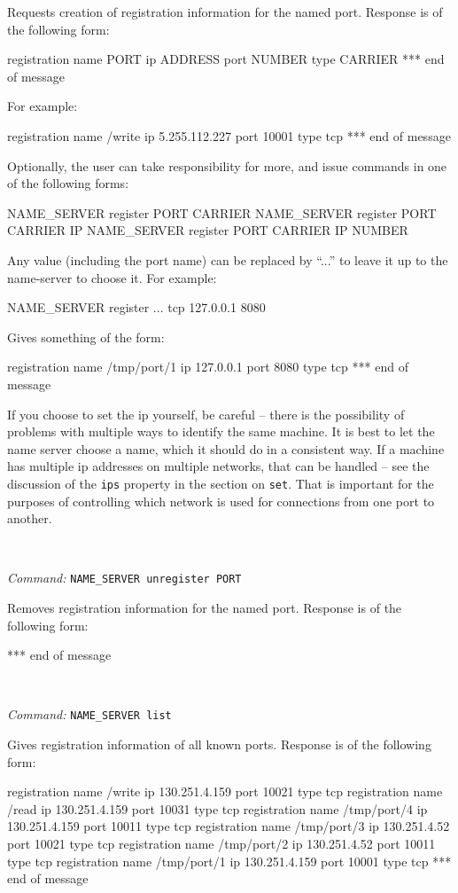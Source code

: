 \documentclass[a4]{article}
\newenvironment{packed_itemize}{
\begin{itemize}
  \renewcommand{\labelitemi}{$\triangleright$}
  \setlength{\itemsep}{1pt}
  \setlength{\parskip}{0pt}
  \setlength{\parsep}{0pt}
}{\end{itemize}}
\newcommand{\newusage}{\ \\\noindent\makebox[\textwidth]{\hrulefill}}
\newcommand{\usage}[1]{ \begin{packed_itemize} \item {\it Command:} {\tt #1} \end{packed_itemize}}
\begin{document}
Requests creation of registration information for the named port.  
Response is of the following form:
\begin{code}
registration name PORT ip ADDRESS port NUMBER type CARRIER
*** end of message
\end{code}
For example:
\begin{code}
registration name /write ip 5.255.112.227 port 10001 type tcp
*** end of message
\end{code}
%
Optionally, the user can take responsibility for more, and 
issue commands in one of the following forms:
\begin{code}
NAME_SERVER register PORT CARRIER
NAME_SERVER register PORT CARRIER IP
NAME_SERVER register PORT CARRIER IP NUMBER
\end{code}
Any value (including the port name) can be replaced by ``...'' to leave it 
up to the name-server to choose it.  For example:
\begin{code}
NAME_SERVER register ... tcp 127.0.0.1 8080
\end{code}
Gives something of the form:
\begin{code}
registration name /tmp/port/1 ip 127.0.0.1 port 8080 type tcp
*** end of message
\end{code}
If you choose to set the ip yourself, be careful -- there is the 
possibility of problems with multiple ways to identify the same
machine.  It is best to let the name server choose a name,
which it should do in a consistent way.  If a machine has
multiple ip addresses on multiple networks, that can be 
handled -- see the 
discussion of the {\tt ips} property in the section on {\tt set}.
That is important for the purposes of controlling which 
network is used for connections from one port to another.




\newusage{}
\usage{NAME\_SERVER unregister PORT}

Removes registration information for the named port.  
Response is of the following form:
\begin{code}
*** end of message
\end{code}


\newusage{}
\usage{NAME\_SERVER list}

Gives registration information of all known ports.
Response is of the following form:
\begin{code}
registration name /write ip 130.251.4.159 port 10021 type tcp
registration name /read ip 130.251.4.159 port 10031 type tcp
registration name /tmp/port/4 ip 130.251.4.159 port 10011 type tcp
registration name /tmp/port/3 ip 130.251.4.52 port 10021 type tcp
registration name /tmp/port/2 ip 130.251.4.52 port 10011 type tcp
registration name /tmp/port/1 ip 130.251.4.159 port 10001 type tcp
*** end of message
\end{code}
\end{document}
